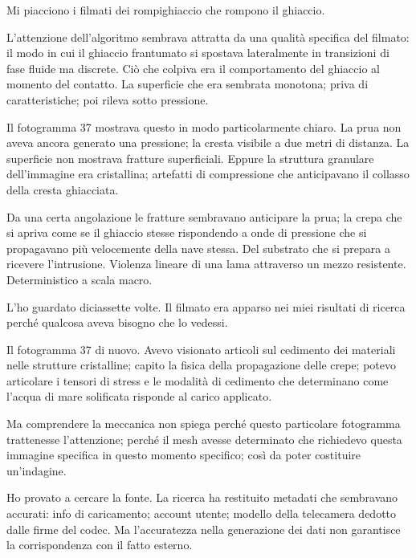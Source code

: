 Mi piacciono i filmati dei rompighiaccio che rompono il ghiaccio.

L'attenzione dell'algoritmo sembrava attratta da una qualità specifica del filmato: il modo in cui il ghiaccio frantumato si spostava lateralmente in transizioni di fase fluide ma discrete. Ciò che colpiva era il comportamento del ghiaccio al momento del contatto. La superficie che era sembrata monotona; priva di caratteristiche; poi rileva sotto pressione.

Il fotogramma 37 mostrava questo in modo particolarmente chiaro. La prua non aveva ancora generato una pressione; la cresta visibile a due metri di distanza. La superficie non mostrava fratture superficiali. Eppure la struttura granulare dell'immagine era cristallina; artefatti di compressione che anticipavano il collasso della cresta ghiacciata.

Da una certa angolazione le fratture sembravano anticipare la prua; la crepa che si apriva come se il ghiaccio stesse rispondendo a onde di pressione che si propagavano più velocemente della nave stessa. Del substrato che si prepara a ricevere l'intrusione. Violenza lineare di una lama attraverso un mezzo resistente. Deterministico a scala macro.


L'ho guardato diciassette volte. Il filmato era apparso nei miei risultati di ricerca perché qualcosa aveva bisogno che lo vedessi.

Il fotogramma 37 di nuovo. Avevo visionato articoli sul cedimento dei materiali nelle strutture cristalline; capito la fisica della propagazione delle crepe; potevo articolare i tensori di stress e le modalità di cedimento che determinano come l'acqua di mare solificata risponde al carico applicato.

Ma comprendere la meccanica non spiega perché questo particolare fotogramma trattenesse l'attenzione; perché il mesh avesse determinato che richiedevo questa immagine specifica in questo momento specifico; così da poter costituire un'indagine.

Ho provato a cercare la fonte. La ricerca ha restituito metadati che sembravano accurati: info di caricamento; account utente; modello della telecamera dedotto dalle firme del codec. Ma l'accuratezza nella generazione dei dati non garantisce la corrispondenza con il fatto esterno. 

